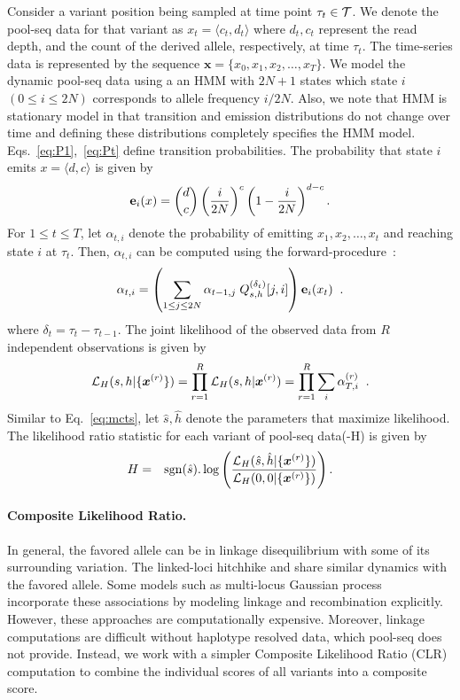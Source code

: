Consider a variant position being sampled at time point $\tau_t\in
{\cal T}$. We denote the pool-seq data for that variant as $x_t =
\langle c_t,d_t \rangle$ where $d_t, c_t$ represent the read depth,
and the count of the derived allele, respectively, at time
$\tau_t$. The time-series data is represented by the sequence
$\bm{x}=\{x_0,x_1,x_2,\ldots,x_T\}$. We model the dynamic pool-seq
data using a an HMM with $2N+1$ states which state $i$ $(0\le i\le
2N)$ corresponds to allele frequency $i/2N$.  Also, we note that HMM
is stationary model in that transition and emission distributions do
not change over time and defining these distributions completely
specifies the HMM model. Eqs.~\ref{eq:P1},~\ref{eq:Pt} define
transition probabilities. The probability that state $i$ emits $
x=\langle d, c\rangle $ is given by
\begin{equation*}
{\bf e}_{i}(x) = {d \choose c} \left(\frac{i}{2N} \right)^c\left (1- 
\frac{i}{2N} \right)^{d-c}.
\end{equation*}
For $1\le t\le T$, let $\alpha_{t,i}$ denote the probability of
emitting $x_1,x_2,\ldots,x_t$ and reaching state $i$ at
$\tau_t$. Then, $\alpha_{t,i}$ can be computed using the
forward-procedure~\cite{durbin1998biological}:
\begin{equation}
  \alpha_{t,i} = \left( \sum_{1\le j\le 2N} 
  \alpha_{t-1,j}\;Q^{(\delta_t)}_{s,h}[j,i] \right) {\bf e}_{i}(x_t)\;\; .
  \label{eq:hmm}
\end{equation}
where $\delta_t=\tau_t-\tau_{t-1}$. The joint likelihood of the
observed data from $R$ independent observations is given by
\begin{equation}
  {\cal L}_{H}(s,h|\{\bm{x}^{(r)}\})=\prod_{r=1}^R{\cal L}_{H}(s,h|\bm{x}^{(r)}) = 
  \prod_{r=1}^R \sum_i\alpha_{T,i}^{(r)}\;\;.
  \label{eq:hmmlik}
\end{equation}
Similar to Eq.~\ref{eq:mcts}, let $\hat{s},\hat{h}$ denote the parameters that
maximize likelihood. The likelihood ratio statistic for
each variant of pool-seq data(\comale-H) is given by
\begin{eqnarray}
H &=& \operatorname{sgn} (\hat{s}). \log 
\left(\frac{{\cal L}_H(\hat{s},\hat{h}|\{\bm{x}^{(r)}\})}{{\cal L}_H(0,0|\{\bm{x}^{(r)}\})}\right).
\label{eq:hmmml}
\end{eqnarray}

\paragraph{Composite Likelihood Ratio.}
In general, the favored allele can be in linkage disequilibrium with
some of its surrounding variation. The linked-loci hitchhike and share
similar dynamics with the favored allele.  Some models such as
multi-locus Gaussian process~\cite{Terhorst2015Multi} incorporate
these associations by modeling linkage and recombination
explicitly. However, these approaches are computationally
expensive. Moreover, linkage computations are difficult without
haplotype resolved data, which pool-seq does not provide. Instead, we
work with a simpler Composite Likelihood Ratio
(CLR)~\cite{nielsen2005genomic,williamson2007localizing} computation
to combine the individual scores of all variants into a composite
score.


